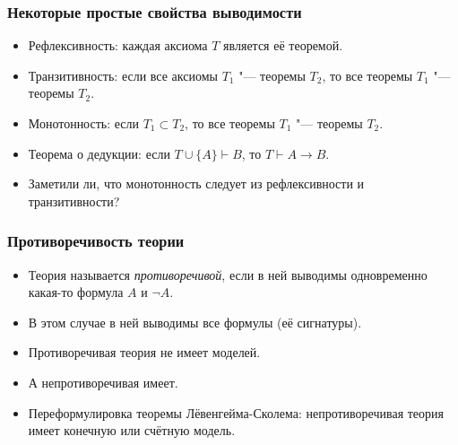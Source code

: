 \documentclass[10pt]{beamer}
\begin{document}
\begin{frame}
    \frametitle{Некоторые простые свойства выводимости}
    \begin{itemize}
        \item Рефлексивность: каждая аксиома $T$ является её теоремой.
        \pause
        \item Транзитивность: если все аксиомы $T_1$ "--- теоремы $T_2$, то все теоремы $T_1$ "--- теоремы $T_2$.
        \pause
        \item Монотонность: если $T_1 \subset T_2$, то все теоремы $T_1$ "--- теоремы $T_2$.
        \pause
        \item Теорема о дедукции: если $T \cup \{A\} \vdash B$, то $T \vdash A \to B$.
        \pause
        \item Заметили ли, что монотонность следует из рефлексивности и транзитивности?
    \end{itemize}
\end{frame}

\begin{frame}
    \frametitle{Противоречивость теории}
    \begin{itemize}
        \item Теория называется \emph{противоречивой}, если в ней выводимы одновременно какая-то формула $A$ и $\neg A$.
        \item В этом случае в ней выводимы все формулы (её сигнатуры).
        \item Противоречивая теория не имеет моделей.
        \item А непротиворечивая имеет.
        \item Переформулировка теоремы Лёвенгейма-Сколема: непротиворечивая теория имеет конечную или счётную модель.
    \end{itemize}
\end{frame}
\end{document}

